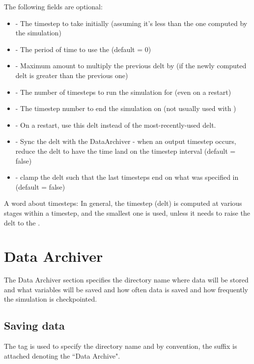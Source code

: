 The following fields are optional:
\begin{itemize}
\item {} - The timestep to take initially (assuming it's less than the one computed by the simulation)
\item {} - The period of time to use the  (default = 0)
\item {} - Maximum amount to multiply the previous delt by (if the newly computed delt is greater than the previous one)
\item {} - The number of timesteps to run the simulation for (even on a restart)
\item {} - The timestep number to end the simulation on (not usually used with )
\item {} - On a restart, use this delt instead of the most-recently-used delt.
\item {} - Sync the delt with the DataArchiver - when an output timestep occurs, reduce the delt to have the time land on the timestep interval (default = false)
\item {} - clamp the delt such that the last timesteps end on what was specified in  (default = false)
\end{itemize}
\begin{NoteBox}
A word about timesteps: In general, the timestep (delt) is computed at various stages within a timestep, and the smallest one is used, unless it needs to raise the delt to the .
\end{NoteBox}

\section{Data Archiver} \label{Sec:DataArchiver}
The Data Archiver section specifies the directory name where data will
be stored and what variables will be saved and how often data is saved
and how frequently the simulation is checkpointed.

\subsection{Saving data}
The  tag is used to specify the directory
name and by convention, the  suffix is attached denoting the
``\Vaango Data Archive".

